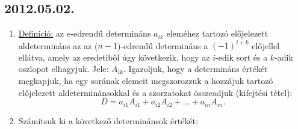 \subsection*{2012.05.02.}
\begin{enumerate}
\item \underline{Definíció:} az $e$-edrendű determináns $a_{ik}$ eleméhez tartozó előjelezett aldetermináns az az ($n-1$)-edrendű determináns a $(-1)^{i+k}$ előjellel ellátva, amely az eredetiből úgy következik, hogy az $i$-edik sort és a $k$-adik oszlopot elhagyjuk. Jele: $A_{ik}$. Igazoljuk, hogy a determináns értékét megkapjuk, ha egy sorának elemeit megszorozzuk a hozzájuk tartozó előjelezett aldeterminánsokkal és a szorzatokat összeadjuk (kifejtési tétel):$$D=a_{i1}A_{i1}+a_{i2}A_{i2}+\ldots+a_{in}A_{in}.$$
\item Számítsuk ki a következő determinánsok értékét:
\end{enumerate}
